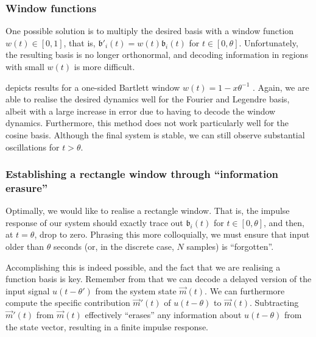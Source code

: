 \subsubsection{Window functions}
One possible solution is to multiply the desired basis with a window function $w(t) \in [0, 1]$, that is, $\mathfrak{b}'_i(t) = w(t) \mathfrak{b}_i(t)$ for $t \in [0, \theta]$.
Unfortunately, the resulting basis is no longer orthonormal, and decoding information in regions with small $w(t)$ is more difficult.

 depicts results for a one-sided Bartlett window $w(t) = 1 - x \theta^{-1}$ \citep[cf.][Section~7.5]{oppenheim2009discretetime}.
Again, we are able to realise the desired dynamics well for the Fourier and Legendre basis, albeit with a large increase in error due to having to decode the window dynamics.
Furthermore, this method does not work particularly well for the cosine basis.
Although the final system is stable, we can still observe substantial oscillations for $t > \theta$.

\subsubsection{Establishing a rectangle window through \enquote{information erasure}}
Optimally, we would like to realise a rectangle window.
That is, the impulse response of our system should exactly trace out $\mathfrak{b}_i(t)$ for $t \in [0, \theta]$, and then, at $t = \theta$, drop to zero.
Phrasing this more colloquially, we must ensure that input older than $\theta$ seconds (or, in the discrete case, $N$ samples) is \enquote{forgotten}.

Accomplishing this is indeed possible, and the fact that we are realising a function basis is key.
Remember from  that we can decode a delayed version of the input signal $u(t - \theta')$ from the system state $\vec m(t)$.
We can furthermore compute the specific contribution $\vec m'(t)$ of $u(t - \theta)$ to $\vec m(t)$.
Subtracting $\vec m'(t)$ from $\vec m(t)$ effectively \enquote{erases} any information about $u(t - \theta)$ from the state vector, resulting in a finite impulse response.


